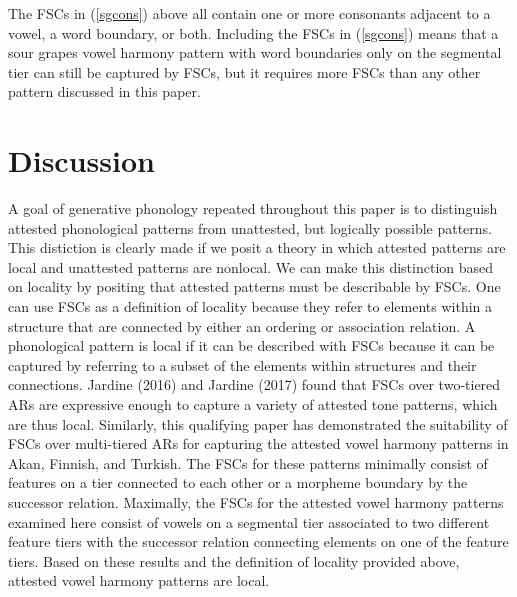 \documentclass[,doc,floatsintext]{apa6}
\theoremstyle{definition}
\theoremstyle{definition}
\theoremstyle{definition}
\theoremstyle{remark}
\begin{document}
\begin{exe}
\end{exe}

\noindent The FSCs in (\ref{sgcons}) above all contain one or more
consonants adjacent to a vowel, a word boundary, or both. Including the
FSCs in (\ref{sgcons}) means that a sour grapes vowel harmony pattern
with word boundaries only on the segmental tier can still be captured by
FSCs, but it requires more FSCs than any other pattern discussed in this
paper.

\section{Discussion}\label{discussion}

A goal of generative phonology repeated throughout this paper is to
distinguish attested phonological patterns from unattested, but
logically possible patterns. This distiction is clearly made if we posit
a theory in which attested patterns are local and unattested patterns
are nonlocal. We can make this distinction based on locality by positing
that attested patterns must be describable by FSCs. One can use FSCs as
a definition of locality because they refer to elements within a
structure that are connected by either an ordering or association
relation. A phonological pattern is local if it can be described with
FSCs because it can be captured by referring to a subset of the elements
within structures and their connections. Jardine (2016) and Jardine
(2017) found that FSCs over two-tiered ARs are expressive enough to
capture a variety of attested tone patterns, which are thus local.
Similarly, this qualifying paper has demonstrated the suitability of
FSCs over multi-tiered ARs for capturing the attested vowel harmony
patterns in Akan, Finnish, and Turkish. The FSCs for these patterns
minimally consist of features on a tier connected to each other or a
morpheme boundary by the successor relation. Maximally, the FSCs for the
attested vowel harmony patterns examined here consist of vowels on a
segmental tier associated to two different feature tiers with the
successor relation connecting elements on one of the feature tiers.
Based on these results and the definition of locality provided above,
attested vowel harmony patterns are local.
\end{document}
